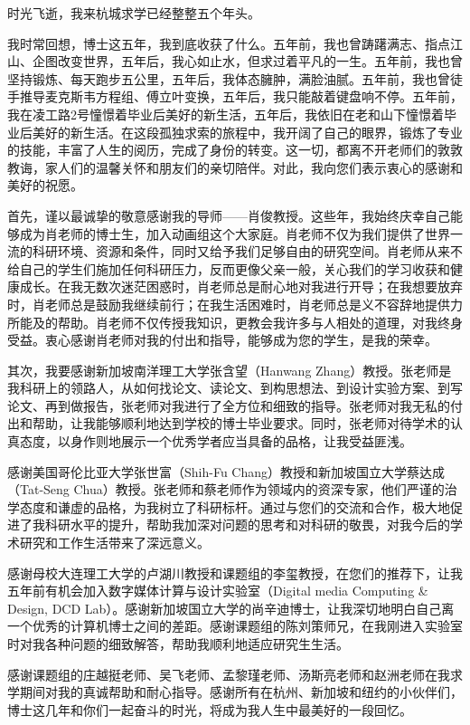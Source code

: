 \begin{thanks}


时光飞逝，我来杭城求学已经整整五个年头。

我时常回想，博士这五年，我到底收获了什么。五年前，我也曾踌躇满志、指点江山、企图改变世界，五年后，我心如止水，但求过着平凡的一生。五年前，我也曾坚持锻炼、每天跑步五公里，五年后，我体态臃肿，满脸油腻。五年前，我也曾徒手推导麦克斯韦方程组、傅立叶变换，五年后，我只能敲着键盘响不停。五年前，我在凌工路2号憧憬着毕业后美好的新生活，五年后，我依旧在老和山下憧憬着毕业后美好的新生活。在这段孤独求索的旅程中，我开阔了自己的眼界，锻炼了专业的技能，丰富了人生的阅历，完成了身份的转变。这一切，都离不开老师们的敦敦教诲，家人们的温馨关怀和朋友们的亲切陪伴。对此，我向您们表示衷心的感谢和美好的祝愿。

首先，谨以最诚挚的敬意感谢我的导师——肖俊教授。这些年，我始终庆幸自己能够成为肖老师的博士生，加入动画组这个大家庭。肖老师不仅为我们提供了世界一流的科研环境、资源和条件，同时又给予我们足够自由的研究空间。肖老师从来不给自己的学生们施加任何科研压力，反而更像父亲一般，关心我们的学习收获和健康成长。在我无数次迷茫困惑时，肖老师总是耐心地对我进行开导；在我想要放弃时，肖老师总是鼓励我继续前行；在我生活困难时，肖老师总是义不容辞地提供力所能及的帮助。肖老师不仅传授我知识，更教会我许多与人相处的道理，对我终身受益。衷心感谢肖老师对我的付出和指导，能够成为您的学生，是我的荣幸。

其次，我要感谢新加坡南洋理工大学张含望（Hanwang Zhang）教授。张老师是我科研上的领路人，从如何找论文、读论文、到构思想法、到设计实验方案、到写论文、再到做报告，张老师对我进行了全方位和细致的指导。张老师对我无私的付出和帮助，让我能够顺利地达到学校的博士毕业要求。同时，张老师对待学术的认真态度，以身作则地展示一个优秀学者应当具备的品格，让我受益匪浅。

感谢美国哥伦比亚大学张世富（Shih-Fu Chang）教授和新加坡国立大学蔡达成（Tat-Seng Chua）教授。张老师和蔡老师作为领域内的资深专家，他们严谨的治学态度和谦虚的品格，为我树立了科研标杆。通过与您们的交流和合作，极大地促进了我科研水平的提升，帮助我加深对问题的思考和对科研的敬畏，对我今后的学术研究和工作生活带来了深远意义。

感谢母校大连理工大学的卢湖川教授和课题组的李玺教授，在您们的推荐下，让我五年前有机会加入数字媒体计算与设计实验室（Digital media Computing \& Design, DCD Lab）。感谢新加坡国立大学的尚辛迪博士，让我深切地明白自己离一个优秀的计算机博士之间的差距。感谢课题组的陈刘策师兄，在我刚进入实验室时对我各种问题的细致解答，帮助我顺利地适应研究生生活。

感谢课题组的庄越挺老师、吴飞老师、孟黎瑾老师、汤斯亮老师和赵洲老师在我求学期间对我的真诚帮助和耐心指导。感谢所有在杭州、新加坡和纽约的小伙伴们，博士这几年和你们一起奋斗的时光，将成为我人生中最美好的一段回忆。


\end{thanks}

